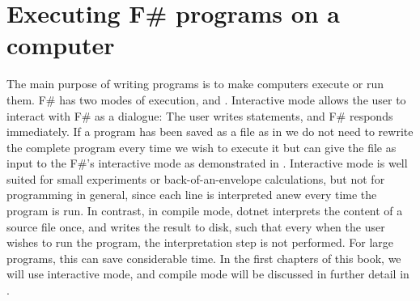 \documentclass[springer.tex]{subfiles}
\begin{document}
\section{Executing F\# programs on a computer}
The main purpose of writing programs is to make computers execute or run them. F\# has two modes of execution,  and . Interactive mode allows the user to interact with F\# as a dialogue: The user writes statements, and F\# responds immediately. If a program has been saved as a file as in  we do not need to rewrite the complete program every time we wish to execute it but can give the file as input to the F\#'s interactive mode as demonstrated in . Interactive mode is well suited for small experiments or back-of-an-envelope calculations, but not for programming in general, since each line is interpreted anew every time the program is run. In contrast, in compile mode, dotnet interprets the content of a source file once, and writes the result to disk, such that every when the user wishes to run the program, the interpretation step is not performed. For large programs, this can save considerable time. In the first chapters of this book, we will use interactive mode, and compile mode will be discussed in further detail in .
\end{document}
